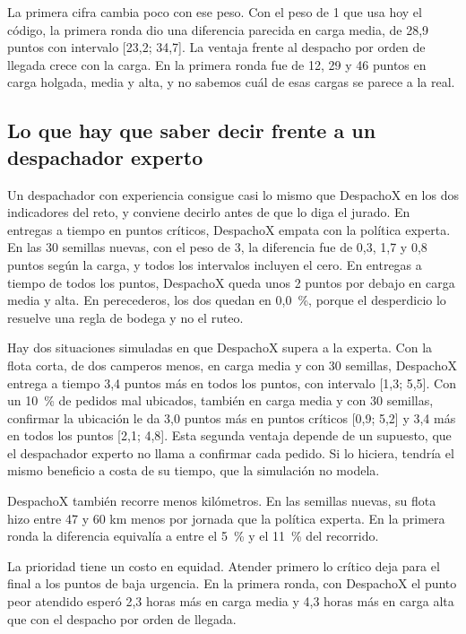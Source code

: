 La primera cifra cambia poco con ese peso. Con el peso de 1 que usa hoy el código, la primera ronda dio una diferencia parecida en carga media, de 28,9 puntos con intervalo [23,2; 34,7]. La ventaja frente al despacho por orden de llegada crece con la carga. En la primera ronda fue de 12, 29 y 46 puntos en carga holgada, media y alta, y no sabemos cuál de esas cargas se parece a la real.

\subsection{Lo que hay que saber decir frente a un despachador experto}

Un despachador con experiencia consigue casi lo mismo que DespachoX en los dos indicadores del reto, y conviene decirlo antes de que lo diga el jurado. En entregas a tiempo en puntos críticos, DespachoX empata con la política experta. En las 30 semillas nuevas, con el peso de 3, la diferencia fue de 0,3, 1,7 y 0,8 puntos según la carga, y todos los intervalos incluyen el cero. En entregas a tiempo de todos los puntos, DespachoX queda unos 2 puntos por debajo en carga media y alta. En perecederos, los dos quedan en 0,0~\%, porque el desperdicio lo resuelve una regla de bodega y no el ruteo.

Hay dos situaciones simuladas en que DespachoX supera a la experta. Con la flota corta, de dos camperos menos, en carga media y con 30 semillas, DespachoX entrega a tiempo 3,4 puntos más en todos los puntos, con intervalo [1,3; 5,5]. Con un 10~\% de pedidos mal ubicados, también en carga media y con 30 semillas, confirmar la ubicación le da 3,0 puntos más en puntos críticos [0,9; 5,2] y 3,4 más en todos los puntos [2,1; 4,8]. Esta segunda ventaja depende de un supuesto, que el despachador experto no llama a confirmar cada pedido. Si lo hiciera, tendría el mismo beneficio a costa de su tiempo, que la simulación no modela.

DespachoX también recorre menos kilómetros. En las semillas nuevas, su flota hizo entre 47 y 60 km menos por jornada que la política experta. En la primera ronda la diferencia equivalía a entre el 5~\% y el 11~\% del recorrido.

La prioridad tiene un costo en equidad. Atender primero lo crítico deja para el final a los puntos de baja urgencia. En la primera ronda, con DespachoX el punto peor atendido esperó 2,3 horas más en carga media y 4,3 horas más en carga alta que con el despacho por orden de llegada.

